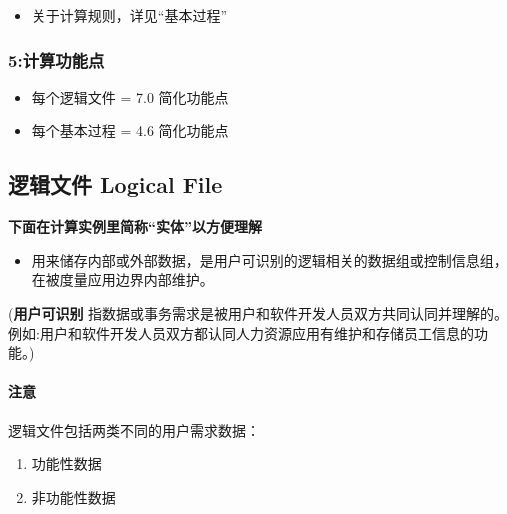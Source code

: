 \begin{itemize}
\tightlist
\item
  关于计算规则，详见``基本过程''
\end{itemize}

\hypertarget{ux8ba1ux7b97ux529fux80fdux70b9}{%
\subsubsection{5:计算功能点}\label{ux8ba1ux7b97ux529fux80fdux70b9}}

\begin{itemize}
\tightlist
\item
  每个逻辑文件 = 7.0 简化功能点
\item
  每个基本过程 = 4.6 简化功能点
\end{itemize}

\hypertarget{ux903bux8f91ux6587ux4ef6-logical-file}{%
\subsection{逻辑文件 Logical
File}\label{ux903bux8f91ux6587ux4ef6-logical-file}}

\textbf{下面在计算实例里简称``实体''以方便理解}

\begin{itemize}
\tightlist
\item
  用来储存内部或外部数据，是用户可识别的逻辑相关的数据组或控制信息组，在被度量应用边界内部维护。
\end{itemize}

\begin{description}
\tightlist
\item[]
(\textbf{用户可识别}
指数据或事务需求是被用户和软件开发人员双方共同认同并理解的。
例如:用户和软件开发人员双方都认同人力资源应用有维护和存储员工信息的功能。)
\end{description}

\hypertarget{ux6ce8ux610f}{%
\paragraph{注意}\label{ux6ce8ux610f}}

逻辑文件包括两类不同的用户需求数据：

\begin{enumerate}
\tightlist
\item
  功能性数据
\item
  非功能性数据
\end{enumerate}

